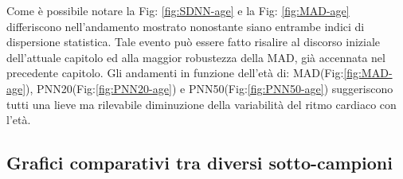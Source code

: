 \documentclass[a4paper, 12pt]{book}
\begin{document}
Come è possibile notare la Fig: \ref{fig:SDNN-age} e la Fig: \ref{fig:MAD-age} differiscono nell'andamento mostrato nonostante siano entrambe indici di dispersione statistica.
Tale evento può essere fatto risalire al discorso iniziale dell'attuale capitolo ed alla maggior robustezza della MAD, già accennata nel precedente capitolo.
Gli andamenti in funzione dell'età di: MAD(Fig:\ref{fig:MAD-age}), PNN20(Fig:\ref{fig:PNN20-age}) e PNN50(Fig:\ref{fig:PNN50-age}) suggeriscono tutti una lieve ma rilevabile diminuzione della variabilità del ritmo cardiaco con l'età.


\subsection{Grafici comparativi tra diversi sotto-campioni}
\end{document}
